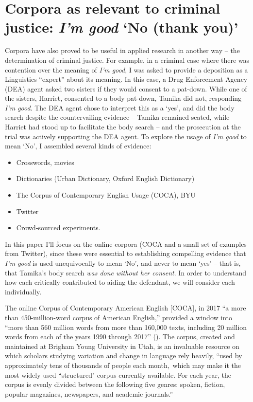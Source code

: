 \documentclass[output=paper,colorlinks,citecolor=brown]{langscibook}
\begin{document}
\section{Corpora as relevant to criminal justice: \textit{I'm good} `No (thank you)'}

Corpora have also proved to be useful in applied research in another way -- the determination of criminal justice. For example, in a criminal case where there was contention over the meaning of \textit{I’m good}, I was asked to provide a deposition as a Linguistics “expert” about its meaning. In this case, a Drug Enforcement Agency (DEA) agent asked two sisters if they would consent to a pat-down. While one of the sisters, Harriet, consented to a body pat-down, Tamika did not, responding \textit{I’m good}. The DEA agent chose to interpret this as a `yes', and did the body search despite the countervailing evidence -- Tamika remained seated, while Harriet had stood up to facilitate the body search -- and the prosecution at the trial was actively supporting the DEA agent. To explore the usage of \textit{I’m good} to mean `No', I assembled several kinds of evidence: 

\begin{itemize}
\item Crosswords, movies
\item Dictionaries (Urban Dictionary, Oxford English Dictionary)
\item The Corpus of Contemporary English Usage (COCA), BYU
\item Twitter
\item Crowd-sourced experiments. 
\end{itemize}


In this paper I'll focus on the online corpora (COCA and a small set of examples from Twitter), since these were essential to establishing compelling evidence that \textit{I’m good} is used unequivocally to mean `No', and never to mean `yes' -- that is, that Tamika’s body search \textit{was done without her consent}. In order to understand how each critically contributed to aiding the defendant, we will consider each individually.

 The online Corpus of Contemporary American English [COCA], in 2017 “a more than 450-million-word corpus of American English,” provided a window into “more than 560 million words from more than 160,000 texts, including 20 million words from each of the years 1990 through 2017” (\textit{\citeauthor{WikicontempAE}}). The corpus, created and maintained at Brigham Young University in Utah, is an invaluable resource on which scholars studying variation and change in language rely heavily, “used by approximately tens of thousands of people each month,~which may make it the most widely used “structured" corpus currently available. For each year, the corpus is evenly divided between the following five genres: spoken, fiction, popular magazines, newspapers, and academic journals.” 
\end{document}
